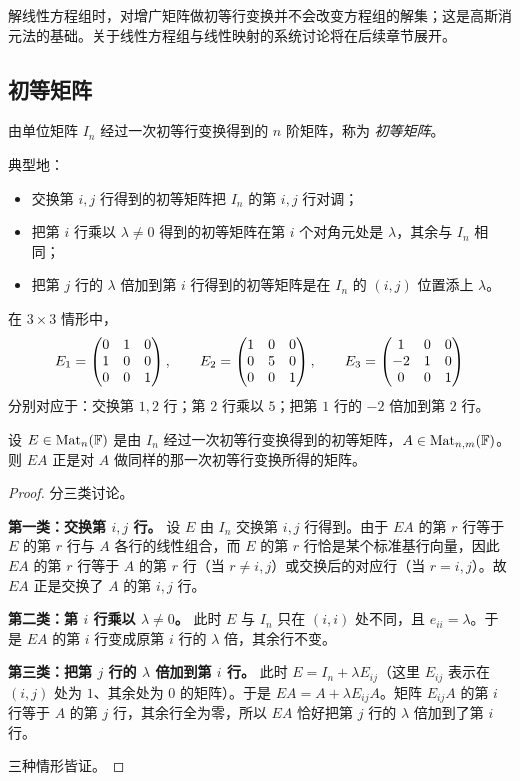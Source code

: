 \begin{remark}
解线性方程组时，对增广矩阵做初等行变换并不会改变方程组的解集；这是高斯消元法的基础。关于线性方程组与线性映射的系统讨论将在后续章节展开。
\end{remark}

\subsection{初等矩阵}

\begin{definition}
由单位矩阵 $I_n$ 经过一次初等行变换得到的 $n$ 阶矩阵，称为 \emph{初等矩阵}。
\end{definition}

典型地：
\begin{itemize}
  \item 交换第 $i,j$ 行得到的初等矩阵把 $I_n$ 的第 $i,j$ 行对调；
  \item 把第 $i$ 行乘以 $\lambda\ne 0$ 得到的初等矩阵在第 $i$ 个对角元处是 $\lambda$，其余与 $I_n$ 相同；
  \item 把第 $j$ 行的 $\lambda$ 倍加到第 $i$ 行得到的初等矩阵是在 $I_n$ 的 $(i,j)$ 位置添上 $\lambda$。
\end{itemize}

\begin{example}
在 $3\times 3$ 情形中，
\[
E_1=\begin{pmatrix} 0&1&0\\1&0&0\\0&0&1 \end{pmatrix},\qquad
E_2=\begin{pmatrix} 1&0&0\\0&5&0\\0&0&1 \end{pmatrix},\qquad
E_3=\begin{pmatrix} 1&0&0\\-2&1&0\\0&0&1 \end{pmatrix}
\]
分别对应于：交换第 $1,2$ 行；第 $2$ 行乘以 $5$；把第 $1$ 行的 $-2$ 倍加到第 $2$ 行。
\end{example}

\begin{proposition}[左乘初等矩阵对应行变换]
设 $E\in\mathrm{Mat}_n(\mathbb{F})$ 是由 $I_n$ 经过一次初等行变换得到的初等矩阵，$A\in\mathrm{Mat}_{n,m}(\mathbb{F})$。则 $EA$ 正是对 $A$ 做同样的那一次初等行变换所得的矩阵。
\end{proposition}

\begin{proof}
分三类讨论。

\textbf{第一类：交换第 $i,j$ 行。} 设 $E$ 由 $I_n$ 交换第 $i,j$ 行得到。由于 $EA$ 的第 $r$ 行等于 $E$ 的第 $r$ 行与 $A$ 各行的线性组合，而 $E$ 的第 $r$ 行恰是某个标准基行向量，因此 $EA$ 的第 $r$ 行等于 $A$ 的第 $r$ 行（当 $r\ne i,j$）或交换后的对应行（当 $r=i,j$）。故 $EA$ 正是交换了 $A$ 的第 $i,j$ 行。

\textbf{第二类：第 $i$ 行乘以 $\lambda\ne 0$。} 此时 $E$ 与 $I_n$ 只在 $(i,i)$ 处不同，且 $e_{ii}=\lambda$。于是 $EA$ 的第 $i$ 行变成原第 $i$ 行的 $\lambda$ 倍，其余行不变。

\textbf{第三类：把第 $j$ 行的 $\lambda$ 倍加到第 $i$ 行。} 此时 $E=I_n+\lambda E_{ij}$（这里 $E_{ij}$ 表示在 $(i,j)$ 处为 $1$、其余处为 $0$ 的矩阵）。于是 $EA=A+\lambda E_{ij}A$。矩阵 $E_{ij}A$ 的第 $i$ 行等于 $A$ 的第 $j$ 行，其余行全为零，所以 $EA$ 恰好把第 $j$ 行的 $\lambda$ 倍加到了第 $i$ 行。

三种情形皆证。
\end{proof}

